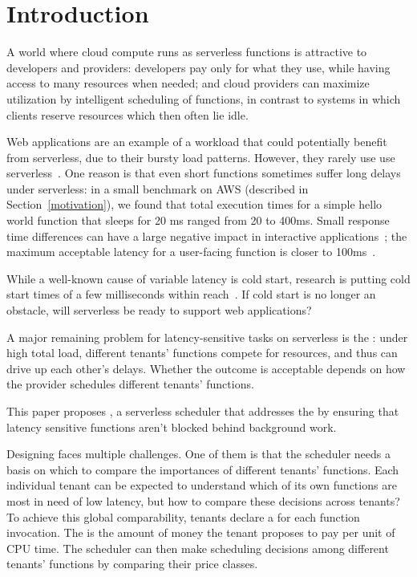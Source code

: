 \section{Introduction}

A world where cloud compute runs as serverless functions is attractive
to developers and providers: developers pay only for what they use,
while having access to many resources when needed; and cloud providers
can maximize utilization by intelligent scheduling of functions, in
contrast to systems in which clients reserve resources which then
often lie idle.

Web applications are an example of a workload that could potentially
benefit from serverless, due to their bursty load patterns. However,
they rarely use use serverless~\cite{reddit-serverless1,
  reddit-serverless2, not-lambda-blog}. One reason is that even short
functions sometimes suffer long delays under serverless: in a small
benchmark on AWS (described in Section~\ref{motivation}), we found that total
execution times for a simple hello world function that sleeps for 20 ms ranged
from 20 to 400ms.
Small response time differences can have a large negative impact in interactive
applications~\cite{amz-page-load,google-page-load}; the maximum acceptable
latency for a user-facing function is closer to 100ms~\cite{page-load-time}.

While a well-known cause of variable latency is cold start, research
is putting cold start times of a few milliseconds within
reach~\cite{sigmaos,mitosis}. If cold start is no longer an obstacle,
will serverless be ready to support web applications?

A major remaining problem for latency-sensitive tasks on serverless
is the \emph{\problem{}}: under high total load, different tenants'
functions compete for resources, and thus can drive up each other's
delays. Whether the outcome is acceptable depends on how the provider
schedules different tenants' functions.

This paper proposes \sys{}, a serverless scheduler that addresses the \problem{}
by ensuring that latency sensitive functions aren't blocked behind background
work.

Designing \sys{} faces multiple challenges. One of them is that the
scheduler needs a basis on which to compare the importances of
different tenants' functions. Each individual tenant can be expected
to understand which of its own functions are most in need of low
latency, but how to compare these decisions across tenants? To achieve
this global comparability, tenants declare a \emph{\priceclass{}} for
each function invocation. The \priceclass{} is the amount of money the
tenant proposes to pay per unit of CPU time. The scheduler can then
make scheduling decisions among different tenants' functions by
comparing their price classes.

